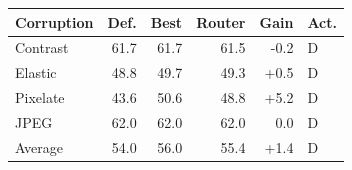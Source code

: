 \begin{tabular}{lrrrrl}
\toprule
Corruption & Def. & Best & Router & Gain & Act. \\
\midrule
Contrast & 61.7 & 61.7 & 61.5 & -0.2 & D \\
Elastic & 48.8 & 49.7 & 49.3 & +0.5 & D \\
Pixelate & 43.6 & 50.6 & 48.8 & +5.2 & D \\
JPEG & 62.0 & 62.0 & 62.0 & 0.0 & D \\
\midrule
Average & 54.0 & 56.0 & 55.4 & +1.4 & D \\
\bottomrule
\end{tabular}
